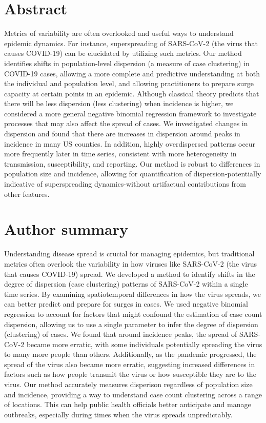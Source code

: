 \documentclass[10pt,letterpaper]{article}
\begin{document}
\section*{Abstract}
Metrics of variability are often overlooked and useful ways to understand epidemic dynamics. 
For instance, superspreading of SARS-CoV-2 (the virus that causes COVID-19) can be elucidated by utilizing such metrics. 
Our method identifies shifts in population-level dispersion (a measure of case clustering) in COVID-19 cases, allowing a more complete and predictive understanding at both the individual and population level, and allowing practitioners to prepare surge capacity at certain points in an epidemic. 
Although classical theory predicts that there will be less dispersion (less clustering) when incidence is higher, we considered a more general negative binomial regression framework to investigate processes that may also affect the spread of cases. 
We investigated changes in dispersion and found that there are increases in dispersion around peaks in incidence in many US counties.
In addition, highly overdispersed patterns occur more frequently later in time series, consistent with more heterogeneity in transmission, susceptibility, and reporting. 
Our method is robust to differences in population size and incidence, allowing for quantification of dispersion-potentially indicative of superspreading dynamics-without artifactual contributions from other features.


\section*{Author summary}
Understanding disease spread is crucial for managing epidemics, but traditional metrics often overlook the variability in how viruses like SARS-CoV-2 (the virus that causes COVID-19) spread. 
We developed a method to identify shifts in the degree of dispersion (case clustering) patterns of SARS-CoV-2  within a single time series.
By examining spatiotemporal differences in how the virus spreads, we can better predict and prepare for surges in cases.
We used negative binomial regression to account for factors that might confound the estimation of case count dispersion, allowing us to use a single parameter to infer the degree of dispersion (clustering) of cases. 
We found that around incidence peaks, the spread of SARS-CoV-2 became more erratic, with some individuals potentially spreading the virus to many more people than others. 
Additionally, as the pandemic progressed, the spread of the virus also became more erratic, suggesting increased differences in factors such as how people transmit the virus or how susceptible they are to the virus.
Our method accurately measures disperison regardless of population size and incidence, providing a way to understand case count clustering across a range of locations. 
This can help public health officials better anticipate and manage outbreaks, especially during times when the virus spreads unpredictably.
\end{document}
